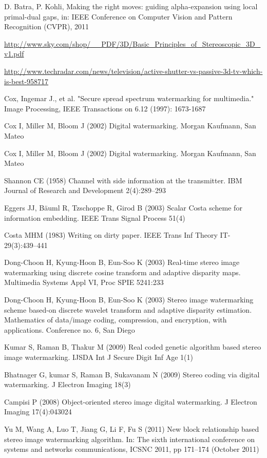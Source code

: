\begin{thebibliography}{99}
D. Batra, P. Kohli, Making the right moves: guiding alpha-expansion using local primal-dual gaps, in: IEEE Conference on Computer Vision and Pattern Recognition (CVPR), 2011

 \url{http://www.sky.com/shop/__PDF/3D/Basic_Principles_of_Stereoscopic_3D_v1.pdf}

 \url{http://www.techradar.com/news/television/active-shutter-vs-passive-3d-tv-which-is-best-958717}

Cox, Ingemar J., et al. "Secure spread spectrum watermarking for multimedia." Image Processing, IEEE Transactions on 6.12 (1997): 1673-1687

Cox I, Miller M, Bloom J (2002) Digital watermarking. Morgan Kaufmann, San Mateo


 Cox I, Miller M, Bloom J (2002) Digital watermarking. Morgan Kaufmann, San Mateo

 Shannon CE (1958) Channel with side information at the transmitter. IBM Journal of Research and Development 2(4):289–293

 Eggers JJ, Bäuml R, Tzschoppe R, Girod B (2003) Scalar Costa scheme for information embedding. IEEE Trans Signal Process 51(4)

 Costa MHM (1983) Writing on dirty paper. IEEE Trans Inf Theory IT-29(3):439–441


Dong-Choon H, Kyung-Hoon B, Eun-Soo K (2003) Real-time stereo image watermarking using discrete cosine transform and adaptive disparity maps. Multimedia Systems Appl VI, Proc SPIE 5241:233

Dong-Choon H, Kyung-Hoon B, Eun-Soo K (2003) Stereo image watermarking scheme based-on discrete wavelet transform and adaptive disparity estimation. Mathematics of data/image coding, compression, and encryption, with applications. Conference no. 6, San Diego

Kumar S, Raman B, Thakur M (2009) Real coded genetic algorithm based stereo image watermarking. IJSDA Int J Secure Digit Inf Age 1(1)

Bhatnager G, kumar S, Raman B, Sukavanam N (2009) Stereo coding via digital watermarking. J Electron Imaging 18(3)

Campisi P (2008) Object-oriented stereo image digital watermarking. J Electron Imaging 17(4):043024

Yu M, Wang A, Luo T, Jiang G, Li F, Fu S (2011) New block relationship based stereo image watermarking algorithm. In: The sixth international conference on systems and networks communications, ICSNC 2011, pp 171–174 (October 2011)


\end{thebibliography}
